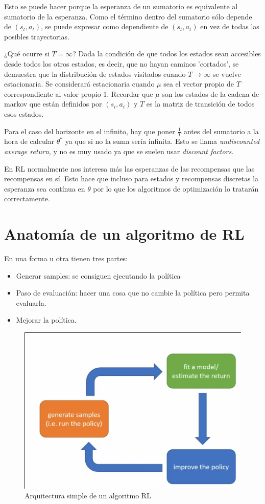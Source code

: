 Esto se puede hacer porque la esperanza de un sumatorio es equivalente al sumatorio de la
esperanza. Como el término dentro del sumatorio sólo depende de $(s_t,a_t)$, se puede expresar
como dependiente de $(s_t,a_t)$ en vez de todas las posibles trayectorias.

¿Qué ocurre si $T=\infty$? Dada la condición de que todos los estados sean accesibles desde
todos los otros estados, es decir, que no hayan caminos 'cortados', se demuestra que la
distribución de estados visitados cuando  $T\rightarrow\infty$ se vuelve estacionaria. Se
considerará estacionaria cuando $\mu$ sea el vector propio de $T$ correspondiente al
valor propio 1. Recordar que $\mu$ son los estados de la cadena de markov que están definidos por
$(s_i, a_i)$ y $T$ es la matriz de transición de todos esos estados.

Para el caso del horizonte en el infinito, hay que poner $\frac{1}{T}$ antes del sumatorio a la
hora de calcular $\theta^*$ ya que si no la suma sería infinita. Esto se llama
\textit{undiscounted average return}, y no es muy usado ya que se suelen usar
\textit{discount factors}.

En RL normalmente nos interesa más las esperanzas de las recompensas que las recompensas en sí.
Esto hace que incluso para estados y recompensas discretas la esperanza sea contínua en $\theta$
por lo que los algoritmos de optimización lo tratarán correctamente.

\section{Anatomía de un algoritmo de RL}%
\label{sec:anatomía_de_un_algoritmo_de_rl}

En una forma u otra tienen tres partes:
\begin{itemize}
    \item Generar samples: se consiguen ejecutando la política
    \item Paso de evaluación: hacer una cosa que no cambie la política pero permita evaluarla.
    \item Mejorar la política.
\end{itemize}

\begin{figure}[htpb]
	\centering
	\includegraphics[width=0.8\linewidth]{figures/2020-06-12-193129_580x417_scrot.png}
	\caption{Arquitectura simple de un algoritmo RL}
\end{figure}

